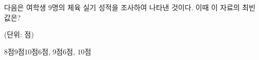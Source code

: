 다음은 여학생 $9$명의 체육 실기 성적을 조사하여 나타낸 것이다. 이때 이 자료의 최빈값은?\par\noindent\hfill{\footnotesize (단위: 점)}
\begin{choices32}{$8$점}{$9$점}{$10$점}{$6$점, $9$점}{$6$점, $10$점}\end{choices32}
